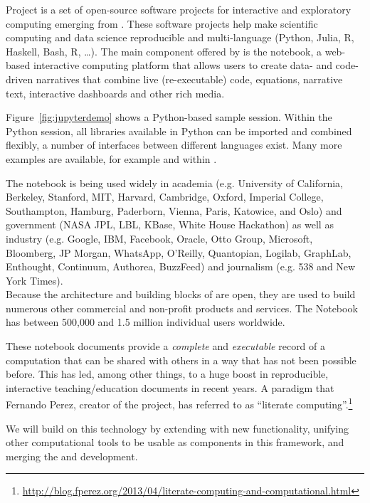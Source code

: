 Project \Jupyter \cite{Jupyter} is a set of open-source software projects for
interactive and exploratory computing emerging from \IPython \cite{IPython}. These
software projects help make scientific computing and data science
reproducible and multi-language (Python, Julia, R, Haskell, Bash, R,
\ldots). The main component offered by \Jupyter is the \Jupyter
notebook, a web-based interactive computing platform that allows users
to create data- and code-driven narratives that combine live
(re-executable) code, equations, narrative text, interactive
dashboards and other rich media.

Figure~\ref{fig:jupyterdemo} shows a Python-based sample
session. Within the Python session, all libraries available in Python
can be imported and combined flexibly, a number of interfaces between
different languages exist. Many more examples are available, for
example \cite{IPython-demo-hyperbolic-conservation-laws} and
within \cite{IPython-sload-foundation-report-2013}.

The \Jupyter notebook is being used widely in academia
(e.g. University of California, Berkeley, Stanford,
MIT, Harvard, Cambridge, Oxford, Imperial College, Southampton,
Hamburg, Paderborn, Vienna, Paris, Katowice, and Oslo) and government
(NASA JPL, LBL, KBase, White House Hackathon) as well as
industry (e.g. Google, IBM, Facebook, Oracle, Otto Group, Microsoft,
Bloomberg, JP Morgan, WhatsApp, O’Reilly, Quantopian, Logilab,
GraphLab, Enthought, Continuum, Authorea, BuzzFeed)  and
journalism (e.g. 538 and New York Times). \\
%
Because the architecture and building blocks of \Jupyter are open,
they are used to build numerous other commercial and non-profit
products and services. The \Jupyter Notebook has between 500,000 and
1.5 million individual users worldwide.

These notebook documents provide a \emph{complete} and
\emph{executable} record of a computation that can be shared with
others in a way that has not been possible before. This has led, among
other things, to a huge boost in reproducible, interactive
teaching/education documents in recent years. A paradigm that Fernando Perez, creator of the project, has referred to as ``literate computing''.\footnote{\url{http://blog.fperez.org/2013/04/literate-computing-and-computational.html}}

We will build on this technology by extending \Jupyter with new
functionality, unifying other computational tools to be usable as
components in this framework, and merging the \Sage and \Jupyter
development.  




